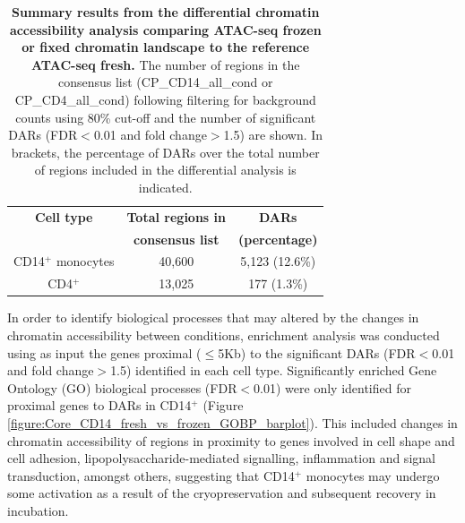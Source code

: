	
	
\begin{table}[htbp]
\centering
\begin{tabular}{@{} c c c}
\toprule
\textbf{Cell type} & \textbf{Total regions in} & \textbf{DARs} \\
                   & \textbf{consensus list}   & \textbf{(percentage)} \\
\midrule
\midrule
CD14$^+$ monocytes & 40,600                    & 5,123 (12.6\%) \\
CD4$^+$            & 13,025                    & 177  (1.3\%) \\
\bottomrule
\end{tabular}
\medskip %
\caption[Summary results from the differential chromatin accessibility analysis comparing ATAC-seq frozen or fixed chromatin landscape to the reference ATAC-seq fresh.]{\textbf{Summary results from the differential chromatin accessibility analysis comparing ATAC-seq frozen or fixed chromatin landscape to the reference ATAC-seq fresh.} The number of regions in the consensus list (CP\_CD14\_all\_cond or CP\_CD4\_all\_cond) following filtering for background counts using 80\% cut-off and the number of significant DARs (FDR$<$0.01 and fold change$>$1.5) are shown. In brackets, the percentage of DARs over the total number of regions included in the differential analysis is indicated.}
\label{tab:Core_ATAC_all_conditions_DARs}
\end{table}
\bigskip %


In order to identify biological processes that may altered by the changes in chromatin accessibility between conditions, enrichment analysis was conducted using as input the genes proximal ($\leq$5Kb) to the significant DARs (FDR$<$0.01 and fold change$>$1.5) identified in each cell type. Significantly enriched Gene Ontology (GO) biological processes (FDR$<$0.01) were only identified for proximal genes to DARs in CD14$^+$ (Figure \ref{figure:Core_CD14_fresh_vs_frozen_GOBP_barplot}). This included changes in chromatin accessibility of regions in proximity to genes involved in cell shape and cell adhesion, lipopolysaccharide-mediated signalling, inflammation and signal transduction, amongst others, suggesting that CD14$^+$ monocytes may undergo some activation as a result of the cryopreservation and subsequent recovery in incubation. 



